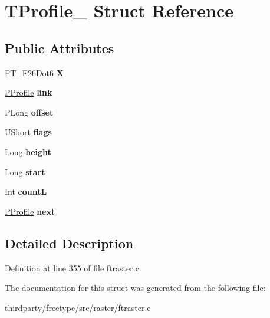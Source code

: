 \hypertarget{struct_t_profile__}{}\section{T\+Profile\+\_\+ Struct Reference}
\label{struct_t_profile__}
\subsection*{Public Attributes}
\begin{DoxyCompactItemize}
\item 
\mbox{\label{struct_t_profile___a60a3afad98842d916f4f1f4ce9817c9b}} 
F\+T\+\_\+\+F26\+Dot6 {\bfseries X}
\item 
\mbox{\label{struct_t_profile___ada0025f5d3e2dc41f1532f12d876e527}} 
\hyperlink{struct_t_profile__}{P\+Profile} {\bfseries link}
\item 
\mbox{\label{struct_t_profile___ad0a94720cc9f7075b405215481fcabf1}} 
P\+Long {\bfseries offset}
\item 
\mbox{\label{struct_t_profile___abad26048a756182d91d6b9e2b0a43fee}} 
U\+Short {\bfseries flags}
\item 
\mbox{\label{struct_t_profile___aab3018b50c1a1e1cdc1951cbd5198c1f}} 
Long {\bfseries height}
\item 
\mbox{\label{struct_t_profile___a9f25836984cbf9f93fd77afcb11ea1d3}} 
Long {\bfseries start}
\item 
\mbox{\label{struct_t_profile___aa40ba7c241fa1fbdbc84222cb157e228}} 
Int {\bfseries countL}
\item 
\mbox{\label{struct_t_profile___a3202d0919ea1f8b982356c81dbe89456}} 
\hyperlink{struct_t_profile__}{P\+Profile} {\bfseries next}
\end{DoxyCompactItemize}


\subsection{Detailed Description}


Definition at line 355 of file ftraster.\+c.



The documentation for this struct was generated from the following file\+:\begin{DoxyCompactItemize}
\item 
thirdparty/freetype/src/raster/ftraster.\+c\end{DoxyCompactItemize}
